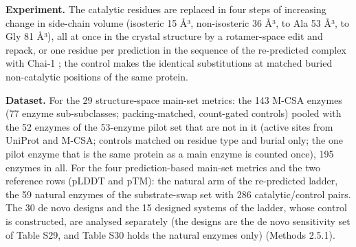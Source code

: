 \documentclass[
  10pt,
]{article}
\DeclareRobustCommand{\_}{\textunderscore\hspace{0pt}}
\begin{document}
\textbf{Experiment.}
The catalytic
residues are
replaced in four
steps of increasing
change in side-chain
volume (isosteric 15
Å³, non-isosteric 36
Å³, to Ala 53 Å³, to
Gly 81 Å³), all at
once in the crystal
structure by a
rotamer-space edit
and repack, or one
residue per
prediction in the
sequence of the
re-predicted complex
with Chai-1
\cite{chai2024}; the
control makes the
identical
substitutions at
matched buried
non-catalytic
positions of the
same protein.

\textbf{Dataset.}
For the 29
structure-space
main-set metrics:
the 143 M-CSA
enzymes
\cite{ribeiro2018}
(77 enzyme
sub-subclasses;
packing-matched,
count-gated
controls) pooled
with the 52 enzymes
of the 53-enzyme
pilot set that are
not in it (active
sites from UniProt
\cite{uniprot2023}
and M-CSA; controls
matched on residue
type and burial
only; the one pilot
enzyme that is the
same protein as a
main enzyme is
counted once), 195
enzymes in all. For
the four
prediction-based
main-set metrics and
the two reference
rows (pLDDT and
pTM): the natural
arm of the
re-predicted ladder,
the 59 natural
enzymes of the
substrate-swap set
with 286
catalytic/control
pairs. The 30 de
novo designs and the
15 designed systems
of the ladder, whose
control is
constructed, are
analysed separately
(the designs are the
de novo sensitivity
set of Table S29,
and Table S30 holds
the natural enzymes
only) (Methods
2.5.1).
\end{document}
